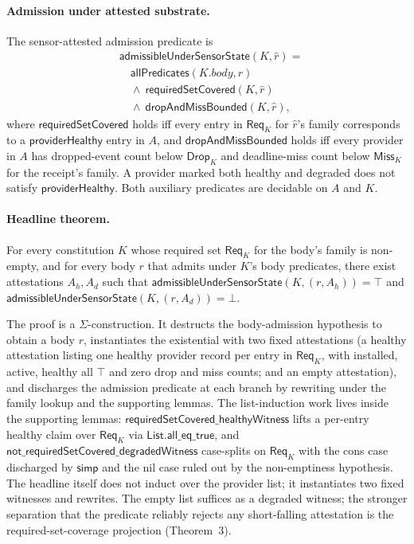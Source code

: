 \paragraph{Admission under attested substrate.}
The sensor-attested admission predicate is
\[
\begin{aligned}
  &\mathsf{admissibleUnderSensorState}(K, \hat r) = \\
   &\quad \mathsf{allPredicates}(K.\mathit{body}, r) \\
   &\quad \wedge\ \mathsf{requiredSetCovered}(K, \hat r) \\
   &\quad \wedge\ \mathsf{dropAndMissBounded}(K, \hat r),
\end{aligned}
\]
where $\mathsf{requiredSetCovered}$ holds iff every entry in $\mathsf{Req}_K$ for $\hat r$'s family corresponds to a $\mathsf{providerHealthy}$ entry in $A$, and $\mathsf{dropAndMissBounded}$ holds iff every provider in $A$ has dropped-event count below $\mathsf{Drop}_K$ and deadline-miss count below $\mathsf{Miss}_K$ for the receipt's family. A provider marked both healthy and degraded does not satisfy $\mathsf{providerHealthy}$. Both auxiliary predicates are decidable on $A$ and $K$.

\paragraph{Headline theorem.}
For every constitution $K$ whose required set $\mathsf{Req}_K$ for the body's family is non-empty, and for every body $r$ that admits under $K$'s body predicates, there exist attestations $A_h, A_d$ such that
$\mathsf{admissibleUnderSensorState}(K, (r, A_h)) = \top$
and
$\mathsf{admissibleUnderSensorState}(K, (r, A_d)) = \bot$.

The proof is a $\Sigma$-construction. It destructs the body-admission hypothesis to obtain a body $r$, instantiates the existential with two fixed attestations (a healthy attestation listing one healthy provider record per entry in $\mathsf{Req}_K$, with installed, active, healthy all $\top$ and zero drop and miss counts; and an empty attestation), and discharges the admission predicate at each branch by rewriting under the family lookup and the supporting lemmas. The list-induction work lives inside the supporting lemmas: $\mathsf{requiredSetCovered\_healthyWitness}$ lifts a per-entry healthy claim over $\mathsf{Req}_K$ via $\mathsf{List.all\_eq\_true}$, and $\mathsf{not\_requiredSetCovered\_degradedWitness}$ case-splits on $\mathsf{Req}_K$ with the cons case discharged by $\mathsf{simp}$ and the nil case ruled out by the non-emptiness hypothesis. The headline itself does not induct over the provider list; it instantiates two fixed witnesses and rewrites. The empty list suffices as a degraded witness; the stronger separation that the predicate reliably rejects any short-falling attestation is the required-set-coverage projection (Theorem~3).

